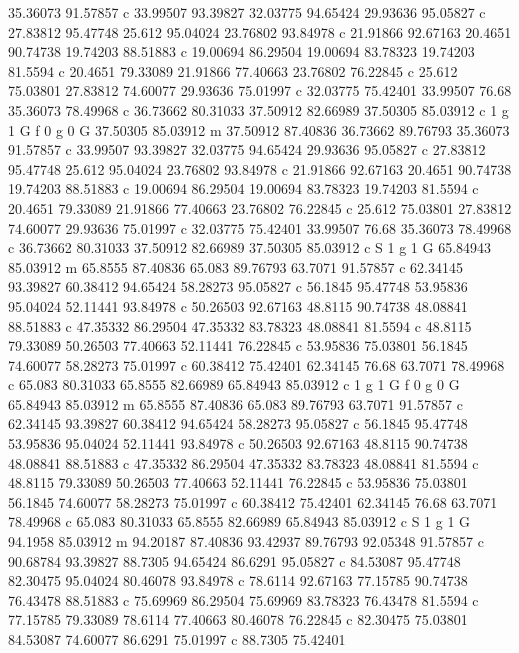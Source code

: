 35.36073 91.57857 c 
33.99507 93.39827 
32.03775 94.65424 
29.93636 95.05827 c 
27.83812 95.47748 
25.612 95.04024 
23.76802 93.84978 c 
21.91866 92.67163 
20.4651 90.74738 
19.74203 88.51883 c 
19.00694 86.29504 
19.00694 83.78323 
19.74203 81.5594 c 
20.4651 79.33089 
21.91866 77.40663 
23.76802 76.22845 c 
25.612 75.03801 
27.83812 74.60077 
29.93636 75.01997 c 
32.03775 75.42401 
33.99507 76.68 
35.36073 78.49968 c 
36.73662 80.31033 
37.50912 82.66989 
37.50305 85.03912 c 
1 g 1 G f 
0 g 0 G 
37.50305 85.03912 m 
37.50912 87.40836 
36.73662 89.76793 
35.36073 91.57857 c 
33.99507 93.39827 
32.03775 94.65424 
29.93636 95.05827 c 
27.83812 95.47748 
25.612 95.04024 
23.76802 93.84978 c 
21.91866 92.67163 
20.4651 90.74738 
19.74203 88.51883 c 
19.00694 86.29504 
19.00694 83.78323 
19.74203 81.5594 c 
20.4651 79.33089 
21.91866 77.40663 
23.76802 76.22845 c 
25.612 75.03801 
27.83812 74.60077 
29.93636 75.01997 c 
32.03775 75.42401 
33.99507 76.68 
35.36073 78.49968 c 
36.73662 80.31033 
37.50912 82.66989 
37.50305 85.03912 c 
S 
1 g 1 G 
65.84943 85.03912 m 
65.8555 87.40836 
65.083 89.76793 
63.7071 91.57857 c 
62.34145 93.39827 
60.38412 94.65424 
58.28273 95.05827 c 
56.1845 95.47748 
53.95836 95.04024 
52.11441 93.84978 c 
50.26503 92.67163 
48.8115 90.74738 
48.08841 88.51883 c 
47.35332 86.29504 
47.35332 83.78323 
48.08841 81.5594 c 
48.8115 79.33089 
50.26503 77.40663 
52.11441 76.22845 c 
53.95836 75.03801 
56.1845 74.60077 
58.28273 75.01997 c 
60.38412 75.42401 
62.34145 76.68 
63.7071 78.49968 c 
65.083 80.31033 
65.8555 82.66989 
65.84943 85.03912 c 
1 g 1 G f 
0 g 0 G 
65.84943 85.03912 m 
65.8555 87.40836 
65.083 89.76793 
63.7071 91.57857 c 
62.34145 93.39827 
60.38412 94.65424 
58.28273 95.05827 c 
56.1845 95.47748 
53.95836 95.04024 
52.11441 93.84978 c 
50.26503 92.67163 
48.8115 90.74738 
48.08841 88.51883 c 
47.35332 86.29504 
47.35332 83.78323 
48.08841 81.5594 c 
48.8115 79.33089 
50.26503 77.40663 
52.11441 76.22845 c 
53.95836 75.03801 
56.1845 74.60077 
58.28273 75.01997 c 
60.38412 75.42401 
62.34145 76.68 
63.7071 78.49968 c 
65.083 80.31033 
65.8555 82.66989 
65.84943 85.03912 c 
S 
1 g 1 G 
94.1958 85.03912 m 
94.20187 87.40836 
93.42937 89.76793 
92.05348 91.57857 c 
90.68784 93.39827 
88.7305 94.65424 
86.6291 95.05827 c 
84.53087 95.47748 
82.30475 95.04024 
80.46078 93.84978 c 
78.6114 92.67163 
77.15785 90.74738 
76.43478 88.51883 c 
75.69969 86.29504 
75.69969 83.78323 
76.43478 81.5594 c 
77.15785 79.33089 
78.6114 77.40663 
80.46078 76.22845 c 
82.30475 75.03801 
84.53087 74.60077 
86.6291 75.01997 c 
88.7305 75.42401 
